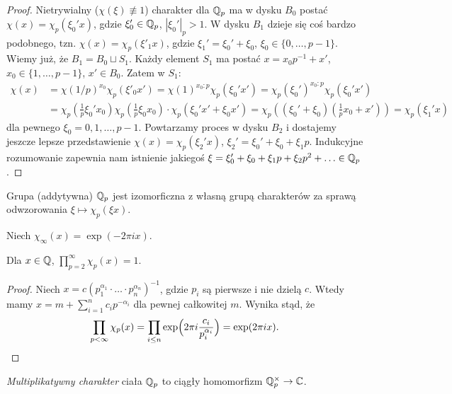 \begin{proof}
	Nietrywialny ($\chi(\xi) \not \equiv 1$) charakter dla $\mathbb Q_p$ ma w dysku $B_0$ postać $\chi(x) = \chi_p(\xi_0'x)$, gdzie $\xi_0' \in \mathbb Q_p$, $|\xi_0'|_p > 1$.
	W dysku $B_1$ dzieje się coś bardzo podobnego, tzn. $\chi (x) = \chi_p(\xi'_1 x)$, gdzie $\xi_1' = \xi_0' + \xi_0$, $\xi_0 \in \{0, \ldots, p-1\}$.
	Wiemy już, że $B_1 = B_0 \sqcup S_1$.
	Każdy element $S_1$ ma postać $x = x_0 p^{-1} + x'$, $x_0 \in \{1, \ldots, p-1\}$, $x' \in B_0$.
	Zatem w $S_1$:
	\begin{align*} 
		\chi(x) & = \chi(1/p)^{x_0} \chi_p (\xi'_0 x') = \chi(1)^{x_0 : p} \chi_p (\xi_0' x') = \chi_p(\xi_0')^{x_0 : p} \chi_p (\xi_0' x') \\ & \textstyle = \chi_p(\frac 1p\xi_0' x_0 ) \chi_p(\frac 1p\xi_0 x_0) \cdot \chi_p(\xi_0' x' + \xi_0 x') = \chi_p((\xi_0' + \xi_0)(\frac 1px_0 + x'))  = \chi_p (\xi_1' x)
	\end{align*}
	dla pewnego $\xi_0 = 0, 1, \ldots, p-1$.
	Powtarzamy proces w dysku $B_2$ i dostajemy jeszcze lepsze przedstawienie $\chi(x) = \chi_p(\xi_2' x)$, $\xi_2' = \xi_0' + \xi_0 + \xi_1 p$.
	Indukcyjne rozumowanie zapewnia nam istnienie jakiegoś $\xi = \xi_0' + \xi_0 + \xi_1 p + \xi_2 p^2 + \ldots \in \mathbb Q_p$.
\end{proof}

\begin{wniosek}
	Grupa (addytywna) $\mathbb Q_p$ jest izomorficzna z własną grupą charakterów za sprawą odwzorowania $\xi \mapsto \chi_p(\xi x)$.
\end{wniosek}

Niech $\chi_\infty(x) = \exp(- 2 \pi i x)$.

\begin{fakt}[,,adelizm'']
	Dla $x \in \mathbb Q$, $\prod_{p = 2}^\infty \chi_p(x) = 1$.
\end{fakt}

\begin{proof}
	Niech $x = c (p_1^{\alpha_1} \cdot \ldots \cdot p_n^{\alpha_n})^{-1}$, gdzie $p_i$ są pierwsze i nie dzielą $c$.
	Wtedy mamy $x = m + \sum_{i=1}^{n} c_ip^{-\alpha_i}$ dla pewnej całkowitej $m$.
	Wynika stąd, że
	\[
		\prod_{p < \infty} \chi_p(x) = \prod_{i \le n} \exp \Bigl(2 \pi i \frac{c_i}{p_i^{\alpha_i}} \Bigr) = \exp (2 \pi i x). \qedhere
	\]
\end{proof}

\begin{definicja}
	\emph{Multiplikatywny charakter}  ciała $\mathbb Q_p$ to ciągły homomorfizm $\mathbb Q_p^\times \to \mathbb C$. %
\end{definicja}

